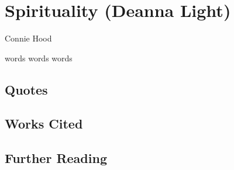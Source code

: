 \chapter{Spirituality (Deanna Light)}

\begin{authors}
	Connie Hood
\end{authors}

words words words


\section{Quotes}

\section{Works Cited}

\section{Further Reading}


